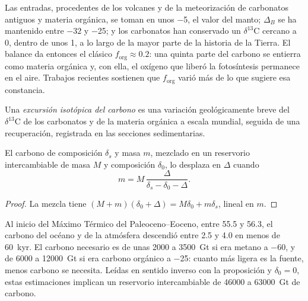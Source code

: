 Las entradas, procedentes de los volcanes y de la meteorización de carbonatos antiguos y
materia orgánica, se toman en unos \qty{-5}{\permil}, el valor del manto; $\Delta_B$ se ha
mantenido entre $-32$ y \qty{-25}{\permil}; y los carbonatos han conservado un
$\delta^{13}\mathrm C$ cercano a 0, dentro de unos \qty{1}{\permil}, a lo largo de la mayor parte de
la historia de la Tierra. El balance da entonces el clásico $f_{\mathrm{org}} \approx
0.2$: una quinta parte del carbono se entierra como materia orgánica y, con ella,
el oxígeno que liberó la fotosíntesis permanece en el aire. Trabajos recientes sostienen que
$f_{\mathrm{org}}$ varió más de lo que sugiere esa constancia.

\begin{definition}\label{def:b3:stable-isotopes:cie}
Una \emph{excursión isotópica del carbono} es una
variación geológicamente breve del $\delta^{13}\mathrm C$ de los carbonatos y de la materia orgánica
a escala mundial, seguida de una recuperación, registrada en las secciones sedimentarias.
\end{definition}

\begin{proposition}\label{prop:b3:stable-isotopes:cie-mass}
El carbono de composición $\delta_s$ y masa $m$, mezclado en un reservorio
intercambiable de masa $M$ y composición $\delta_0$, lo desplaza en $\Delta$ cuando
\[
m = M\,\frac{\Delta}{\delta_s - \delta_0 - \Delta}.
\]
\end{proposition}

\begin{proof}
La mezcla tiene $(M + m)(\delta_0 + \Delta) = M\delta_0 + m\delta_s$, lineal en
$m$.
\end{proof}

Al inicio del Máximo Térmico del Paleoceno--Eoceno, entre 55.5 y
\qty{56.3}{\Ma}, el carbono del océano y de la atmósfera descendió entre 2.5 y
\qty{4.0}{\permil} en menos de \qty{60}{kyr}. El carbono necesario es de unas
2000 a \qty{3500}{Gt} si era metano a \qty{-60}{\permil}, y de 6000 a
\qty{12000}{Gt} si era carbono orgánico a \qty{-25}{\permil}: cuanto más ligera
es la fuente, menos carbono se necesita. Leídas en sentido inverso con la
proposición y $\delta_0 = 0$, estas estimaciones implican un reservorio
intercambiable de \num{46000} a \qty{63000}{Gt} de carbono.

